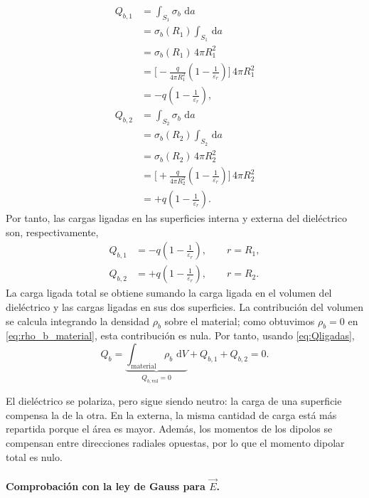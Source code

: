 \documentclass[11pt]{article}
\newcommand{\dd}{\,\mathrm d}
\begin{document}
\begin{align*}
    Q_{b,1}
      &=\int_{S_1}\sigma_b\,\dd a\\
      &=\sigma_b(R_1)\int_{S_1}\dd a\\
      &=\sigma_b(R_1)\,4\pi R_1^2\\
      &=\Biggl[
          -\frac{q}{4\pi R_1^2}
          \left(1-\frac{1}{\varepsilon_r}\right)
        \Biggr]\,4\pi R_1^2\\
      &=-q\left(1-\frac{1}{\varepsilon_r}\right),\\[10pt]
    Q_{b,2}
      &=\int_{S_2}\sigma_b\,\dd a\\
      &=\sigma_b(R_2)\int_{S_2}\dd a\\
      &=\sigma_b(R_2)\,4\pi R_2^2\\
      &=\Biggl[
          +\frac{q}{4\pi R_2^2}
          \left(1-\frac{1}{\varepsilon_r}\right)
        \Biggr]\,4\pi R_2^2\\
      &=+q\left(1-\frac{1}{\varepsilon_r}\right).
\end{align*}
Por tanto, las cargas ligadas en las superficies interna y
externa del dieléctrico son, respectivamente,
\begin{equation}
  \boxed{
    \begin{aligned}
      Q_{b,1}
        &=-q\left(1-\frac{1}{\varepsilon_r}\right),
        \qquad r=R_1,\\[9pt]
      Q_{b,2}
        &=+q\left(1-\frac{1}{\varepsilon_r}\right),
        \qquad r=R_2.
    \end{aligned}
  }
  \label{eq:Qligadas}
\end{equation}
La carga ligada total se obtiene sumando la carga ligada en
el volumen del dieléctrico y las cargas ligadas en sus dos
superficies. La contribución del volumen se calcula integrando
la densidad $\rho_b$ sobre el material; como obtuvimos
$\rho_b=0$ en \eqref{eq:rho_b_material}, esta contribución es
nula. Por tanto, usando \eqref{eq:Qligadas},
\[
  Q_b
    =\underbrace{
       \int_{\mathrm{material}}\rho_b\,\dd V
     }_{Q_{b,\mathrm{vol}}=0}
     +Q_{b,1}+Q_{b,2}
    =0.
\]

El dieléctrico se polariza, pero sigue siendo neutro: la carga
de una superficie compensa la de la otra. En la externa,
la misma cantidad de carga está más repartida porque el área
es mayor. Además, los momentos de los dipolos se compensan
entre direcciones radiales opuestas, por lo que el momento
dipolar total es nulo.

\paragraph{Comprobación con la ley de Gauss para $\vec E$.}
\end{document}
